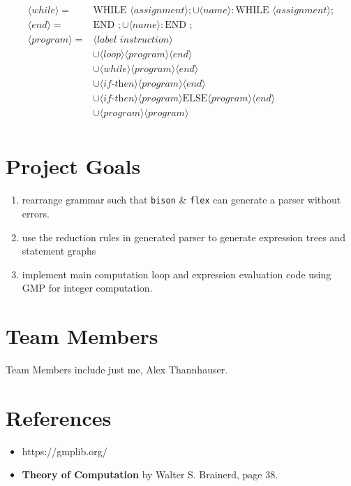 \documentclass[letterpaper,11pt]{article}
\begin{document}
{{\begin{align*}
			\langle while \rangle =& \text{WHILE } \langle assignment \rangle;
				\cup \langle name \rangle: \text{WHILE } \langle assignment \rangle;\\
			\langle end \rangle =& \text{END };
				\cup \langle name \rangle: \text{END };\\
			\langle program \rangle =& \langle \textit{label instruction} \rangle\\
				& \cup \langle loop \rangle \langle program \rangle \langle end \rangle\\
				& \cup \langle while \rangle \langle program \rangle \langle end \rangle\\
				& \cup \langle \textit{if-then} \rangle \langle program \rangle \langle end \rangle\\
				& \cup \langle \textit{if-then} \rangle \langle program \rangle \text{ELSE} \langle program \rangle \langle end \rangle\\
				& \cup \langle program \rangle \langle program \rangle\\
		\end{align*}
		
	}
	
	\section{Project Goals}
	{
		\begin{enumerate}
			\item rearrange grammar such that \texttt{bison} \& \texttt{flex}
			can generate a parser without errors.
			\item use the reduction rules in generated parser to generate
			expression trees and statement graphs
			\item implement main computation loop and expression evaluation code
			using GMP for integer computation.
		\end{enumerate}
	}
	
	\section{Team Members}
	{
		Team Members include just me, Alex Thannhauser.
	}
	
	\section{References}
	{
		\begin{itemize}
			\item https://gmplib.org/
			\item \textbf{Theory of Computation} by Walter S. Brainerd, page 38.
		\end{itemize}
	}

}
\end{document}
